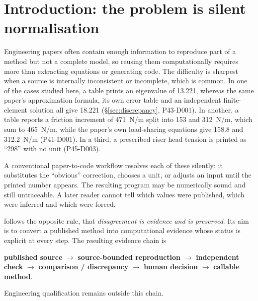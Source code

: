 \section{Introduction: the problem is silent normalisation}
\label{sec:intro}

Engineering papers often contain enough information to reproduce part of a method but not a complete model, so reusing them computationally requires more than extracting equations or generating code. The difficulty is sharpest when a source is internally inconsistent or incomplete, which is common. In one of the cases studied here, a table prints an eigenvalue of 13.221, whereas the same paper's approximation formula, its own error table and an independent finite-element solution all give 18.221 (\S\ref{sec:discrepancy}, P43-D001). In another, a table reports a friction increment of 471~N/m split into 153 and 312~N/m, which sum to 465~N/m, while the paper's own load-sharing equations give 158.8 and 312.2~N/m (P41-D001). In a third, a prescribed riser head tension is printed as ``298'' with no unit (P45-D003).

A conventional paper-to-code workflow resolves each of these silently: it substitutes the ``obvious'' correction, chooses a unit, or adjusts an input until the printed number appears. The resulting program may be numerically sound and still untraceable. A later reader cannot tell which values were published, which were inferred and which were forced.

\engiproof{} follows the opposite rule, that \emph{disagreement is evidence and is preserved}. Its aim is to convert a published method into computational evidence whose status is explicit at every step. The resulting evidence chain is
\begin{center}
\textbf{published source} $\rightarrow$ \textbf{source-bounded reproduction} $\rightarrow$ \textbf{independent check} $\rightarrow$ \textbf{comparison / discrepancy} $\rightarrow$ \textbf{human decision} $\rightarrow$ \textbf{callable method}.
\end{center}
Engineering qualification remains outside this chain.

